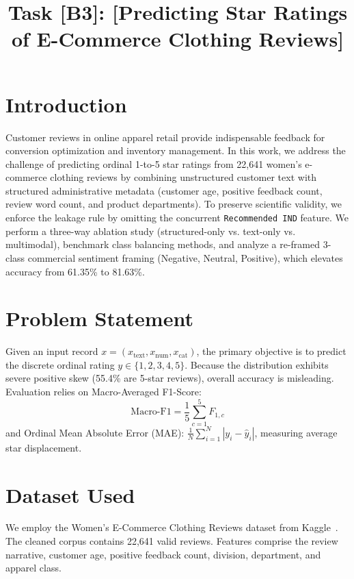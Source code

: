 \documentclass[conference]{IEEEtran}
\begin{document}
\title{Task [B3]: [Predicting Star Ratings of E-Commerce Clothing Reviews]}

\author{
}

\maketitle

\section{Introduction}
Customer reviews in online apparel retail provide indispensable feedback for conversion optimization and inventory management. In this work, we address the challenge of predicting ordinal 1-to-5 star ratings from 22,641 women's e-commerce clothing reviews by combining unstructured customer text with structured administrative metadata (customer age, positive feedback count, review word count, and product departments). To preserve scientific validity, we enforce the leakage rule by omitting the concurrent \texttt{Recommended IND} feature. We perform a three-way ablation study (structured-only vs. text-only vs. multimodal), benchmark class balancing methods, and analyze a re-framed 3-class commercial sentiment framing (Negative, Neutral, Positive), which elevates accuracy from 61.35\% to 81.63\%.

\section{Problem Statement}
Given an input record $x = (x_{\text{text}}, x_{\text{num}}, x_{\text{cat}})$, the primary objective is to predict the discrete ordinal rating $y \in \{1, 2, 3, 4, 5\}$. Because the distribution exhibits severe positive skew (55.4\% are 5-star reviews), overall accuracy is misleading. Evaluation relies on Macro-Averaged F1-Score:
\begin{equation}
\text{Macro-F1} = \frac{1}{5} \sum_{c=1}^5 F_{1,c}
\end{equation}
and Ordinal Mean Absolute Error (MAE): $\frac{1}{N} \sum_{i=1}^N |y_i - \hat{y}_i|$, measuring average star displacement.

\section{Dataset Used}
We employ the Women's E-Commerce Clothing Reviews dataset from Kaggle~\cite{nicapotato2018}. The cleaned corpus contains 22,641 valid reviews. Features comprise the review narrative, customer age, positive feedback count, division, department, and apparel class.
\end{document}
